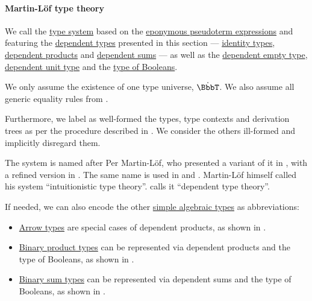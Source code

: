 \paragraph{Martin-L\"of type theory}

\begin{definition}\label{def:mltt}\mimprovised
  We call  the \hyperref[def:abstract_type_system]{type system} based on the \hyperref[def:mltt_pseudoterm]{eponymous pseudoterm expressions} and featuring the \hyperref[con:dependent_type]{dependent types} presented in this section --- \hyperref[def:identity_type]{identity types}, \hyperref[def:dependent_product]{dependent products} and \hyperref[def:dependent_sum]{dependent sums} --- as well as the \hyperref[def:dependent_empty_type]{dependent empty type}, \hyperref[def:dependent_unit_type]{dependent unit type} and the \hyperref[def:type_of_booleans]{type of Booleans}.

  We only assume the existence of one type universe, \( \syn\BbbT \). We also assume all generic equality rules from .

  Furthermore, we label as well-formed the types, type contexts and derivation trees as per the procedure described in . We consider the others ill-formed and implicitly disregard them.
\end{definition}
\begin{comments}
  \item The system is named after Per Martin-L\"of, who presented a variant of it in \cite{MartinLöf1975IntuitionisticTypeTheory}, with a refined version in \cite{MartinLöf1984IntuitionisticTypeTheory}. The same name is used in \cite{UnivalentFoundationsProgram2024OctoberHoTT} and \cite[ch. 8]{Mimram2020ProgramEqualsProof}. Martin-L\"of himself called his system \enquote{intuitionistic type theory}. \cite[ch. 8]{Mimram2020ProgramEqualsProof} calls it \enquote{dependent type theory}.

  \item If needed, we can also encode the other \hyperref[def:simple_algebraic_types]{simple algebraic types} as abbreviations:
  \begin{itemize}
    \item \hyperref[def:arrow_type]{Arrow types} are special cases of dependent products, as shown in .
    \item \hyperref[def:simple_product_type]{Binary product types} can be represented via dependent products and the type of Booleans, as shown in .
    \item \hyperref[def:simple_sum_type]{Binary sum types} can be represented via dependent sums and the type of Booleans, as shown in .
  \end{itemize}
\end{comments}

